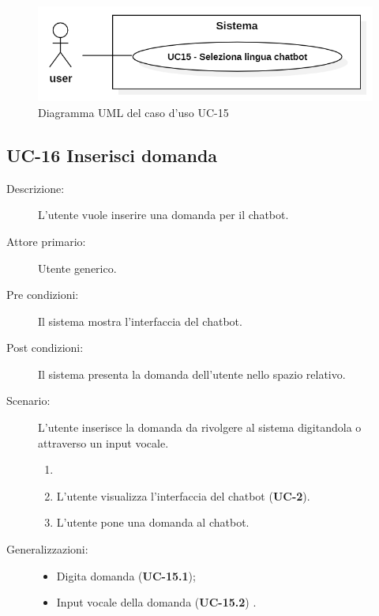 \begin{figure}[H]
    \centering
    \includegraphics[width=0.8\linewidth]{UC15.png}
    \caption{Diagramma UML del caso d'uso UC-15}
    \label{fig:UC15}
\end{figure}

\subsection{UC-16 Inserisci domanda}
\begin{description}
    \item[Descrizione:] L'utente vuole inserire una domanda per il chatbot.
    \item[Attore primario:] Utente generico.
    \item[Pre condizioni:] Il sistema mostra l'interfaccia del chatbot.
    \item[Post condizioni:] Il sistema presenta la domanda dell'utente nello spazio relativo.
    \item[Scenario:] L'utente inserisce la domanda da rivolgere al sistema digitandola o attraverso un input vocale.
    \begin{enumerate}
        \item[] 
        \item L’utente visualizza l'interfaccia del chatbot (\textbf{UC-2}).
        \item L’utente pone una domanda al chatbot.
    \end{enumerate}
    \item[Generalizzazioni:] 
    \begin{itemize}
        \item Digita domanda (\textbf{UC-15.1});
        \item Input vocale della domanda (\textbf{UC-15.2}) .
    \end{itemize}
\end{description}


